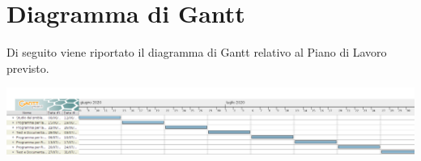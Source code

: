 \section{Diagramma di Gantt}
Di seguito viene riportato il diagramma di Gantt relativo al Piano di Lavoro previsto.
\begin{center}
    \includegraphics[scale=0.3]{./img/GanttVale.png}
     \label{fig:ganttvale}
	 \end{center}
		